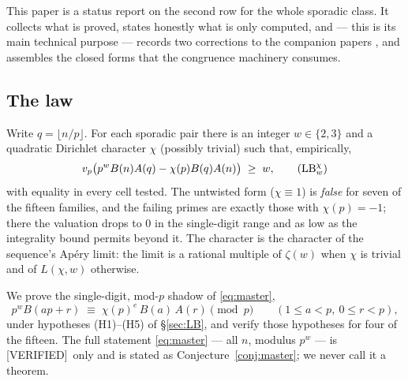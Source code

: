 \documentclass[11pt,reqno]{amsart}
\theoremstyle{plain}
\theoremstyle{definition}
\theoremstyle{remark}
\newcommand{\vp}{v_p}
\newcommand{\Verified}{\textup{\textsf{[VERIFIED]}}}
\numberwithin{equation}{section}
\begin{document}
This paper is a status report on the second row for the whole sporadic class. It collects
what is proved, states honestly what is only computed, and --- this is its main technical
purpose --- records two corrections to the companion papers
\cite{CompanionLucas2nd,CompanionLucasMin}, and assembles the closed forms that the
congruence machinery consumes.

\subsection{The law}
Write $q=\lfloor n/p\rfloor$. For each sporadic pair there is an integer $w\in\{2,3\}$ and
a quadratic Dirichlet character $\chi$ (possibly trivial) such that, empirically,
\begin{equation}\label{eq:master}
  \vp\bigl(p^{w}B(n)A(q)-\chi(p)B(q)A(n)\bigr)\;\ge\;w ,
  \tag{$\mathrm{LB}_w^\chi$}
\end{equation}
with equality in every cell tested. The untwisted form ($\chi\equiv1$) is
\emph{false} for seven of the fifteen families, and the failing primes are exactly those
with $\chi(p)=-1$; there the valuation drops to $0$ in the single-digit range and as low as
the integrality bound permits beyond it. The character is the character of the sequence's
Ap\'ery limit: the limit is a rational multiple of $\zeta(w)$ when $\chi$ is trivial and of
$L(\chi,w)$ otherwise.

We prove the single-digit, mod-$p$ shadow of \eqref{eq:master},
\begin{equation}\label{eq:LB}
  p^{w}B(ap+r)\;\equiv\;\chi(p)^{e}\,B(a)\,A(r)\pmod p\qquad(1\le a<p,\ 0\le r<p),
\end{equation}
under hypotheses (H1)--(H5) of \S\ref{sec:LB}, and verify those hypotheses for four of the
fifteen. The full statement \eqref{eq:master} --- all $n$, modulus $p^w$ --- is
\Verified\ only and is stated as Conjecture~\ref{conj:master}; we never call it a theorem.
\end{document}
